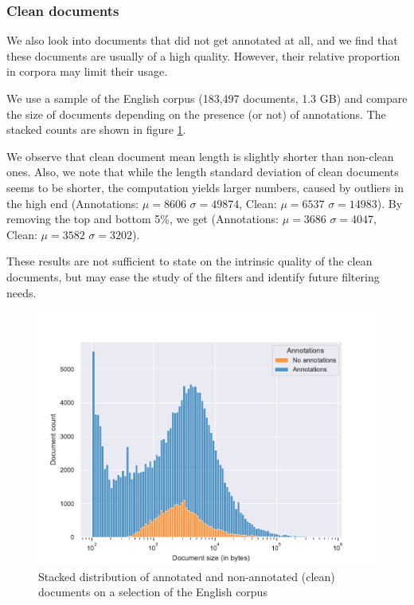 \subsubsection{Clean documents}

We also look into documents that did not get annotated at all, and we find that these documents are usually of a high quality. However, their relative proportion in corpora may limit their usage.

We use a sample of the English corpus (183,497 documents, 1.3 GB) and compare the size of documents depending on the presence (or not) of annotations. The stacked counts are shown in figure \ref{clean_count}.

We observe that clean document mean length is slightly shorter than non-clean ones. Also, we note that while the length standard deviation of clean documents seems to be shorter, the computation yields larger numbers, caused by outliers in the high end (Annotations: $\mu=8606$ $\sigma=49874$, Clean: $\mu=6537$ $\sigma=14983$).
By removing the top and bottom 5\%, we get (Annotations: $\mu=3686$ $\sigma=4047$, Clean: $\mu=3582$ $\sigma=3202$).

These results are not sufficient to state on the intrinsic quality of the clean documents, but may ease the study of the filters and identify future filtering needs.

\begin{figure}[!ht]
    \begin{center}
        \includegraphics[width=\linewidth]{static/media/data/towards/num_doc_clean}
        \caption{Stacked distribution of annotated and non-annotated (clean) documents on a selection of the English corpus}
        \label{clean_count}
    \end{center}
\end{figure}

